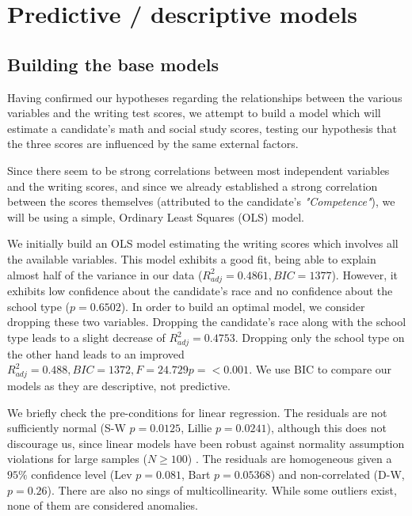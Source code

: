 \documentclass[10pt, a4paper]{article}
\begin{document}
	
	\section{Predictive / descriptive models}
	\label{sec::models}
	
	\subsection{Building the base models}
	Having confirmed our hypotheses regarding the relationships between the various variables and the writing test scores, we attempt to build a model which will estimate a candidate's math and social study scores, testing our hypothesis that the three scores are influenced by the same external factors. 
	
	Since there seem to be strong correlations between most independent variables and the writing scores, and since we already established a strong correlation between the scores themselves (attributed to the candidate's \textit{"Competence"}), we will be using a simple, Ordinary Least Squares (OLS) model.
	
	We initially build an OLS model estimating the writing scores which involves all the available variables. This model exhibits a good fit, being able to explain almost half of the variance in our data ($R^2_{adj} = 0.4861, BIC=1377$). However, it exhibits low confidence about the candidate's race and no confidence about the school type ($p=0.6502$). In order to build an optimal model, we consider dropping these two variables. Dropping the candidate's race along with the school type leads to a slight decrease of $R^2_{adj} = 0.4753$. Dropping only the school type on the other hand leads to an improved $R^2_{adj} = 0.488, BIC=1372, F= 24.729 p=<0.001$. We use BIC to compare our models as they are descriptive, not predictive.
	
	We briefly check the pre-conditions for linear regression. The residuals are not sufficiently normal (S-W $p = 0.0125$, Lillie $p=0.0241$), although this does not discourage us, since linear models have been robust against normality assumption violations for large samples ($N\geq 100$) \cite{ols_linear}. The residuals are homogeneous given a $95\%$ confidence level (Lev $p = 0.081$, Bart $p = 0.05368$) and non-correlated (D-W, $p=0.26$). There are also no sings of multicollinearity. While some outliers exist, none of them are considered anomalies.
	
\end{document}

